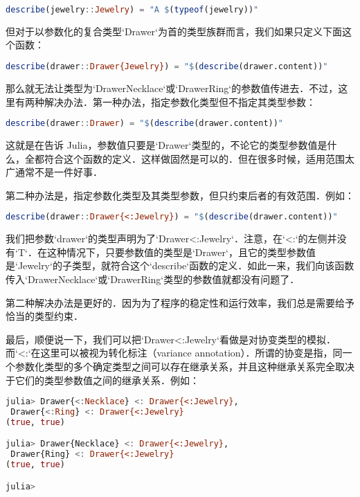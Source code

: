 \begin{lstlisting}[language=julia]
describe(jewelry::Jewelry) = "A $(typeof(jewelry))"
\end{lstlisting}

但对于以参数化的复合类型`Drawer`为首的类型族群而言，我们如果只定义下面这个函数：

\begin{lstlisting}[language=julia]
describe(drawer::Drawer{Jewelry}) = "$(describe(drawer.content))"
\end{lstlisting}

那么就无法让类型为`Drawer{Necklace}`或`Drawer{Ring}`的参数值传进去．不过，这里有两种解决办法．第一种办法，指定参数化类型但不指定其类型参数：

\begin{lstlisting}[language=julia]
describe(drawer::Drawer) = "$(describe(drawer.content))"
\end{lstlisting}

这就是在告诉 Julia，参数值只要是`Drawer`类型的，不论它的类型参数值是什么，全都符合这个函数的定义．这样做固然是可以的．但在很多时候，适用范围太广通常不是一件好事．

第二种办法是，指定参数化类型及其类型参数，但只约束后者的有效范围．例如：

\begin{lstlisting}[language=julia]
describe(drawer::Drawer{<:Jewelry}) = "$(describe(drawer.content))"
\end{lstlisting}

我们把参数`drawer`的类型声明为了`Drawer{<:Jewelry}`．注意，在`<:`的左侧并没有`T`．在这种情况下，只要参数值的类型是`Drawer`，且它的类型参数值是`Jewelry`的子类型，就符合这个`describe`函数的定义．如此一来，我们向该函数传入`Drawer{Necklace}`或`Drawer{Ring}`类型的参数值就都没有问题了．

第二种解决办法是更好的．因为为了程序的稳定性和运行效率，我们总是需要给予恰当的类型约束．

最后，顺便说一下，我们可以把`Drawer{<:Jewelry}`看做是对协变类型的模拟．而`<:`在这里可以被视为转化标注（variance annotation）．所谓的协变是指，同一个参数化类型的多个确定类型之间可以存在继承关系，并且这种继承关系完全取决于它们的类型参数值之间的继承关系．例如：

\begin{lstlisting}[language=julia]
julia> Drawer{<:Necklace} <: Drawer{<:Jewelry},
 Drawer{<:Ring} <: Drawer{<:Jewelry}
(true, true)

julia> Drawer{Necklace} <: Drawer{<:Jewelry},
 Drawer{Ring} <: Drawer{<:Jewelry}
(true, true)

julia> 
\end{lstlisting}

